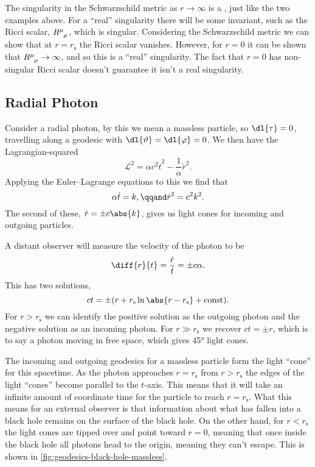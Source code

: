 \documentclass[fleqn]{NotesClass}
\newcommand*{\lagrangian}{\mathcal{L}}
\begin{document}
    The singularity in the Schwarzschild metric as \(r \to \infty\) is a , just like the two examples above.
    For a \enquote{real} singularity there will be some invariant, such as the Ricci scalar, \(\tensor{R}{^\mu_\mu}\), which is singular.
    Considering the Schwarzschild metric we can show that at \(r = r_{\mathrm{s}}\) the Ricci scalar vanishes.
    However, for \(r = 0\) it can be shown that \(\tensor{R}{^\mu_\mu} \to \infty\), and so this is a \enquote{real} singularity.
    The fact that \(r = 0\) has non-singular Ricci scalar doesn't guarantee it isn't a real singularity.
    
    \subsection{Radial Photon}
    Consider a radial photon, by this we mean a massless particle, so \(\dl{\tau} = 0\), travelling along a geodesic with \(\dl{\vartheta} = \dl{\varphi} = 0\).
    We then have the Lagrangian-squared
    \begin{equation}
        \lagrangian^2 = \alpha c^2\dot{t}^2 - \frac{1}{\alpha}\dot{r}^2.
    \end{equation}
    Applying the Euler--Lagrange equations to this we find that
    \begin{equation}
        \alpha\dot{t} = k, \qqand \dot{r}^2 = c^2k^2.
    \end{equation}
    The second of these, \(\dot{r} = \pm c\abs{k}\), gives us light cones for incoming and outgoing particles.
    
    A distant observer will measure the velocity of the photon to be
    \begin{equation}
        \diff{r}{t} = \frac{\dot{r}}{\dot{t}} = \pm c\alpha.
    \end{equation}
    This has two solutions,
    \begin{equation}
        ct = \pm(r + r_{\mathrm{s}} \ln\abs{r - r_{\mathrm{s}}} + \mathrm{const}).
    \end{equation}
    For \(r > r_{\mathrm{s}}\) we can identify the positive solution as the outgoing photon and the negative solution as an incoming photon.
    For \(r \gg r_{\mathrm{s}}\) we recover \(ct = \pm r\), which is to say a photon moving in free space, which gives \ang{45} light cones.
    
    The incoming and outgoing geodesics for a massless particle form the light \enquote{cone} for this spacetime.
    As the photon approaches \(r = r_{\mathrm{s}}\) from \(r > r_{\mathrm{s}}\) the edges of the light \enquote{cones} become parallel to the \(t\)-axis.
    This means that it will take an infinite amount of coordinate time for the particle to reach \(r = r_{\mathrm{s}}\).
    What this means for an external observer is that information about what has fallen into a black hole remains on the surface of the black hole.
    On the other hand, for \(r < r_{\mathrm{s}}\) the light cones are tipped over and point toward \(r = 0\), meaning that once inside the black hole all photons head to the origin, meaning they can't escape.
    This is shown in \cref{fig:geodesics-black-hole-massless}.
    
\end{document}
